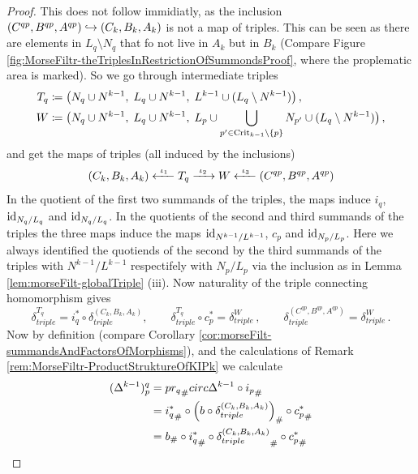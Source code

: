 \begin{proof}
	This does not follow immidiatly, as the inclusion $({C}^{qp},{B}^{qp},{A}^{qp})\hookrightarrow (C_k,B_k,A_k)$ is not a map of triples. This can be seen as there are elements in $L_q\setminus N_q$ that fo not live in $A_k$ but in $B_k$ (Compare Figure \ref{fig:MorseFiltr-theTriplesInRestrictionOfSummondsProof}, where the proplematic area is marked). So we go through intermediate triples
		\begin{align*}
			T_q &\coloneq \big(N_q \cup N^{k-1},\; L_q \cup N^{k-1},\; L^{k-1}\cup (L_q \setminus N^{k-1})\big)\,,\\
			W   &\coloneq \big(N_q\cup N^{k-1},\; L_q\cup N^{k-1},\;
						       L_p\cup \bigcup_{p'\in \mathrm{Crit}_{k-1}\setminus\{p\}}N_{p'}\cup (L_q\setminus N^{k-1})\big)\,,
		\end{align*}
	and get the maps of triples (all induced by the inclusions)
	\begin{equation*}
		(C_k,B_k,A_k)\xleftarrow{\ \iota_1\ }T_q \xrightarrow{\ \iota_2 \ } W \xleftarrow{ \ \iota_3 \ }(\qp{C},\qp{B},\qp{A})
	\end{equation*}
	In the quotient of the first two summands of the triples, the maps induce 
	$i_q$, $\operatorname{\mathrm{id}}_{N_q/ L_q}$ and $ \operatorname{\mathrm{id}}_{N_q/ L_q}$. In the quotients of the second and third summands of the triples the three maps induce the maps
	$\operatorname{\mathrm{id}}_{N^{k-1}/L^{k-1}}$, $c_p$ and $\operatorname{\mathrm{id}}_{N_p/L_p}$. 
	Here we always identified the quotiends of the second by the third summands of the triples with $N^{k-1}/L^{k-1}$ 
	respectifely with $N_p/L_p$ via the inclusion as in Lemma \ref{lem:morseFilt-globalTriple} (iii). Now naturality of the triple connecting homomorphism gives
	\begin{equation*}
		\delta_{triple}^{T_q}=i_q^* \circ \delta^{(C_k,B_k,A_k)}_{triple},\qquad
		\delta_{triple}^{T_q} \circ c_p^*=\delta_{triple}^{W}\,,\qquad
		\delta_{triple}^{(C^{qp},B^{qp},A^{qp})}=\delta_{triple}^W\,. 
	\end{equation*}
	Now by definition (compare Corollary \ref{cor:morseFilt-summandsAndFactorsOfMorphisms}), and the calculations of Remark \ref{rem:MorseFiltr-ProductStruktureOfKIPk} we calculate
	\begin{align*}
		(\Delta^{k-1})^{q}_p
		&=\pcomp{pr_q}circ \Delta^{k-1}\circ \pcomp{i_p}\\
		&= \pcomp{i_q^*}\circ \pcomp{\left(b\circ \delta^{(C_k,B_k,A_k)}_{triple}\right)} \circ \pcomp{c^*_p}\\
		&=\pcomp{b}\circ \pcomp{i_q^*}\circ \pcomp{ \delta^{(C_k,B_k,A_k)}_{triple}} \circ \pcomp{c^*_p}\\

\end{align*}
\end{proof}
